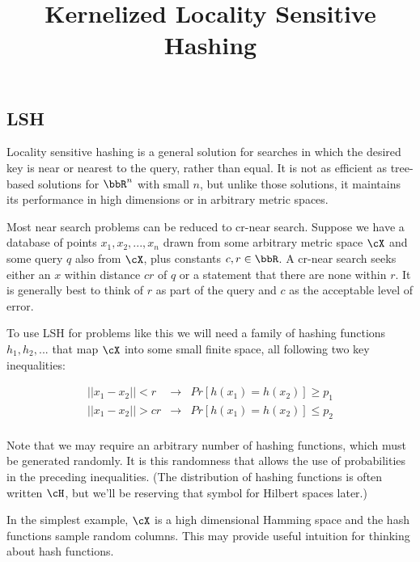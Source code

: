 \documentclass[twoside,11pt]{homework}
\title{Kernelized Locality Sensitive Hashing}
\begin{document}
\maketitle

\begin{abstract}
\end{abstract}

\begin{multicols}{2}

\section{LSH} %

Locality sensitive hashing is a general solution for searches in which
the desired key is near or nearest to the query, rather than equal.
It is not as efficient as tree-based solutions for $\bbR^n$ with small
$n$, but unlike those solutions, it maintains its performance in high
dimensions or in arbitrary metric spaces.

Most near search problems can be reduced to cr-near search.  Suppose
we have a database of points $x_1,x_2,...,x_n$ drawn from some
arbitrary metric space $\cX$ and some query $q$ also from $\cX$, plus
constants $c,r\in\bbR$.  A cr-near search seeks either an $x$ within
distance $cr$ of $q$ or a statement that there are none within $r$.
It is generally best to think of $r$ as part of the query and $c$ as
the acceptable level of error.

To use LSH for problems like this we will need a family of hashing
functions $h_1,h_2,...$ that map $\cX$ into some small finite space,
all following two key inequalities:

\begin{eqnarray*}
  ||x_1-x_2|| < r & \rightarrow & Pr[h(x_1)=h(x_2)] \geq p_1 \\
  ||x_1-x_2|| > cr & \rightarrow & Pr[h(x_1)=h(x_2)] \leq p_2 \\
\end{eqnarray*}

Note that we may require an arbitrary number of hashing functions,
which must be generated randomly.  It is this randomness that allows
the use of probabilities in the preceding inequalities.  (The
distribution of hashing functions is often written $\cH$, but we'll be
reserving that symbol for Hilbert spaces later.)

In the simplest example, $\cX$ is a high dimensional Hamming space and
the hash functions sample random columns.  This may provide useful
intuition for thinking about hash functions.


\end{multicols}
\end{document}
